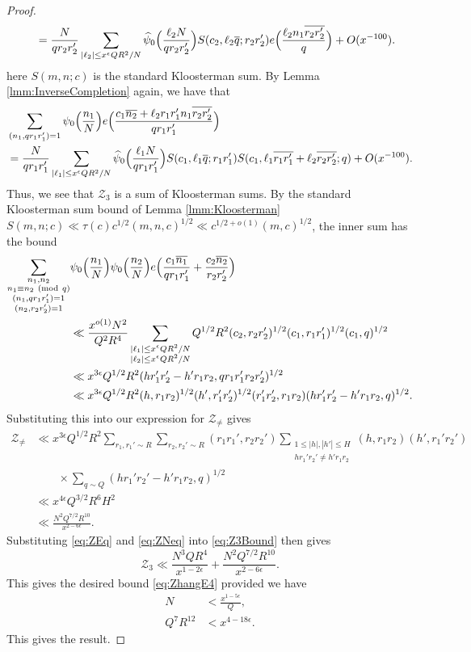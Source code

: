 \documentclass[10pt]{amsart}
\theoremstyle{plain}
\numberwithin{equation}{section}
\newcommand{\Mod}[1]{\ (\mathrm{mod}\ #1)}
\renewcommand{\hat}[1]{\widehat #1}
\begin{document}
\begin{proof}
\begin{align*}
&\qquad=\frac{N}{q r_2 r_2'}\sum_{|\ell_2|\le x^\epsilon QR^2/N}\hat{\psi_0}\Bigl(\frac{\ell_2 N}{q r_2r_2'}\Bigr)S(c_2,\ell_2\overline{q};r_2r_2')e\Bigl(\frac{\ell_2 n_1 \overline{r_2r_2'}}{q}\Bigr) +O(x^{-100}).
\end{align*}
here $S(m,n;c)$ is the standard Kloosterman sum. By Lemma \ref{lmm:InverseCompletion} again, we have that
\begin{align*}
&\sum_{(n_1,q r_1 r_1')=1}\psi_0\Bigl(\frac{n_1}{N}\Bigr)e\Bigl(\frac{c_1\overline{n_2}+\ell_2 r_1 r_1' n_1\overline{r_2r_2'} }{q r_1 r_1'}\Bigr)\\
&=\frac{N}{q r_1r_1'}\sum_{|\ell_1|\le x^\epsilon Q R^2/N}\hat{\psi_0}\Bigl(\frac{\ell_1 N}{q r_1 r_1'}\Bigr)S(c_1,\ell_1\overline{q};r_1 r_1')S(c_1,\ell_1\overline{r_1 r_1'}+\ell_2\overline{r_2r_2'};q)+O(x^{-100}).
\end{align*}
Thus, we see that $\mathscr{Z}_{3}$ is a sum of Kloosterman sums. By the standard Kloosterman sum bound of Lemma \ref{lmm:Kloosterman} $S(m,n;c)\ll \tau(c) c^{1/2}(m,n,c)^{1/2}\ll c^{1/2+o(1)}(m,c)^{1/2}$, the inner sum has the bound
\begin{align*}
\sum_{\substack{n_1,n_2\\ n_1\equiv n_2\Mod{q} \\ (n_1,qr_1r_1')=1\\ (n_2,r_2r_2')=1}}&\psi_0\Bigl(\frac{n_1}{N}\Bigr)\psi_0\Bigl(\frac{n_2}{N}\Bigr)e\Bigl(\frac{c_1\overline{n_1}}{q r_1r_1'}+\frac{c_2\overline{n_2}}{r_2 r_2'}\Bigr)\\
&\ll \frac{x^{o(1)}N^2}{Q^2 R^4}\sum_{\substack{|\ell_1|\le x^\epsilon QR^2/N\\ |\ell_2|\le x^\epsilon QR^2/N}}Q^{1/2}R^2 (c_2,r_2r_2')^{1/2}(c_1,r_1r_1')^{1/2}(c_1,q)^{1/2}\\
&\ll x^{3\epsilon}Q^{1/2}R^2 (hr_1'r_2'-h'r_1r_2,qr_1r_1'r_2r_2')^{1/2}\\
&\ll x^{3\epsilon}Q^{1/2}R^2 (h,r_1r_2)^{1/2}(h',r_1'r_2')^{1/2}(r_1'r_2',r_1r_2) (hr_1'r_2'-h'r_1r_2,q)^{1/2}.
\end{align*}
Substituting this into our expression for $\mathscr{Z}_{\ne}$ gives
\begin{align}
\mathscr{Z}_{\ne}&\ll x^{3\epsilon} Q^{1/2} R^2\sum_{r_1,r_1'\sim R}\sum_{r_2,r_2'\sim R}(r_1r_1',r_2r_2')\sum_{\substack{1\le |h|,|h'|\le H\\ hr_1'r_2'\ne h'r_1r_2}}(h,r_1r_2)(h',r_1'r_2')\nonumber\\
&\qquad \times\sum_{q\sim Q}(hr_1'r_2'-h'r_1r_2,q)^{1/2}\nonumber\\
&\ll x^{4\epsilon} Q^{3/2} R^6 H^2\nonumber\\
&\ll \frac{N^2 Q^{7/2} R^{10}}{x^{2-6\epsilon}}.\label{eq:ZNeq}
\end{align}
Substituting \eqref{eq:ZEq} and \eqref{eq:ZNeq} into \eqref{eq:Z3Bound} then gives
\[
\mathscr{Z}_3\ll \frac{N^3 Q R^4}{x^{1-2\epsilon}}+\frac{N^2 Q^{7/2} R^{10}}{x^{2-6\epsilon}}.
\]
This gives the desired bound \eqref{eq:ZhangE4} provided we have
\begin{align}
N&<\frac{x^{1-5\epsilon} }{Q},\\
Q^{7} R^{12}&<x^{4-18\epsilon}.
\end{align}
This gives the result.
\end{proof}
\end{document}
